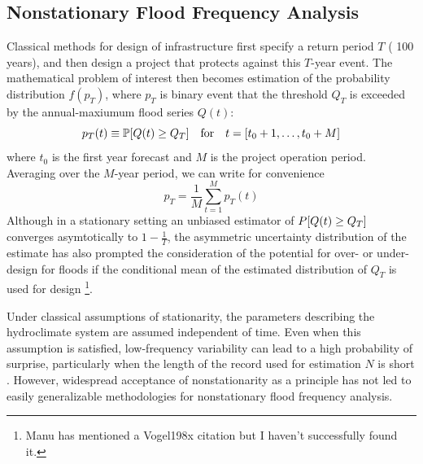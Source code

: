 \documentclass[11pt]{article}
\begin{document}
\subsection{Nonstationary Flood Frequency Analysis\label{sec:ffa}}

Classical methods for design of infrastructure first specify a return period \(T\) (\ie{} 100 years), and then design a project that protects against this \(T\)-year event.
The mathematical problem of interest then becomes estimation of the probability distribution \( f(p_T) \), where \( p_T \) is binary event that the threshold \( Q_T \) is exceeded by the annual-maxiumum flood series \( Q(t) \):
\begin{equation}
  p_T(t) \equiv \probability \qty[ Q(t) \geq Q_T] \qqtext{for} t = \qty[t_0 + 1, \ldots, t_0 + M]
\end{equation}
where \( t_0 \) is the first year forecast and \( M \) is the project operation period.
Averaging over the \(M\)-year period, we can write for convenience
\begin{equation}
  p_T = \frac{1}{M} \sum_{t=1}^{M} p_T(t)
\end{equation}
Although in a stationary setting an unbiased estimator of \( P \qty[ Q(t) \geq Q_T] \) converges asymtotically to \(1 - \frac{1}{T}\), the asymmetric uncertainty distribution of the estimate has also prompted the consideration of the potential for over- or under-design for floods if the conditional mean of the estimated distribution of \( Q_T \) is used for design \citep{Stedinger1997}\footnote{Manu has mentioned a Vogel198x citation but I haven't successfully found it.}.

Under classical assumptions of stationarity, the parameters describing the hydroclimate system are assumed independent of time.
Even when this assumption is satisfied, low-frequency variability can lead to a high probability of surprise, particularly when the length of the record used for estimation \(N\) is short \citep{Jain2001,Matalas2012}.
However, widespread acceptance of nonstationarity as a principle has not led to easily generalizable methodologies for nonstationary flood frequency analysis.
\end{document}
